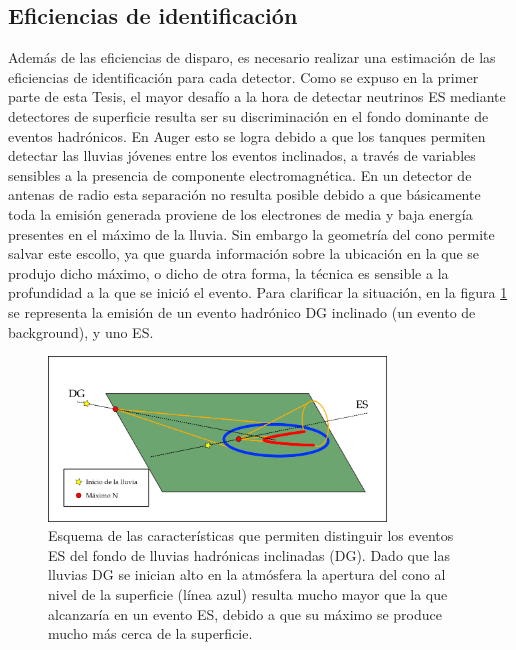 	\clearpage
	\subsection{Eficiencias de identificaci\'on}
	\label{sc:identificacionRadio}
	
	Adem\'as de las eficiencias de disparo, es necesario realizar una estimaci\'on de las eficiencias de identificaci\'on para cada detector.
	Como se expuso en la primer parte de esta Tesis, el mayor desaf\'io a la hora de detectar neutrinos ES mediante detectores de superficie resulta ser su discriminaci\'on en el fondo dominante de eventos hadr\'onicos.
	En Auger esto se logra debido a que los tanques \cher{} permiten detectar las lluvias j\'ovenes entre los eventos inclinados, a trav\'es de variables sensibles a la presencia de componente electromagn\'etica.
	En un detector de antenas de radio esta separaci\'on no resulta posible debido a que b\'asicamente toda la emisi\'on generada proviene de los electrones de media y baja energ\'ia presentes en el m\'aximo de la lluvia.
	Sin embargo la geometr\'ia del cono \cher{} permite salvar este escollo, ya que guarda informaci\'on sobre la ubicaci\'on en la que se produjo dicho m\'aximo, o dicho de otra forma, la t\'ecnica es sensible a la profundidad a la que se inici\'o el evento.
	Para clarificar la situaci\'on, en la figura \ref{fig:dg_vs_es_radio} se representa la emisi\'on de un evento hadr\'onico DG inclinado (un evento de background), y uno ES.
	\begin{figure}[ht!]
		\centering
		\includegraphics[width=0.8\textwidth]{./fig/simulacionRadio/idRadio.png}
		\caption{\label{fig:dg_vs_es_radio}
		Esquema de las caracter\'isticas que permiten distinguir los eventos ES del fondo de lluvias hadr\'onicas inclinadas (DG). Dado que las lluvias DG se inician alto en la atm\'osfera la apertura del cono \cher{} al nivel de la superficie (l\'inea azul) resulta mucho mayor que la que alcanzar\'ia en un evento ES, debido a que su m\'aximo se produce mucho m\'as cerca de la superficie.
		}
	\end{figure}
